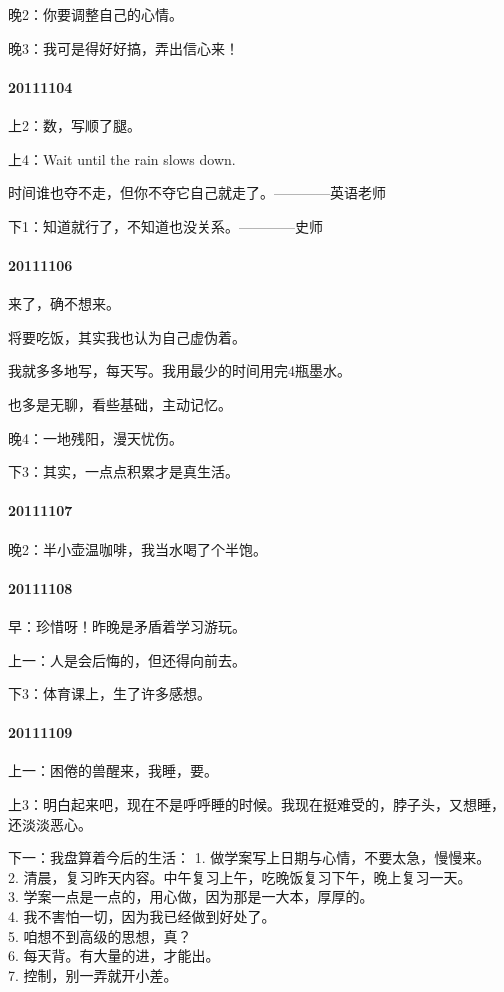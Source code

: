 \documentclass[UTF8]{book}
\begin{document}
晚2：你要调整自己的心情。

晚3：我可是得好好搞，弄出信心来！


\paragraph{20111104}
上2：数，写顺了腿。

上4：Wait until the rain slows down.

时间谁也夺不走，但你不夺它自己就走了。————英语老师

下1：知道就行了，不知道也没关系。————史师


\paragraph{20111106}
来了，确不想来。

将要吃饭，其实我也认为自己虚伪着。

我就多多地写，每天写。我用最少的时间用完4瓶墨水。

也多是无聊，看些基础，主动记忆。

晚4：一地残阳，漫天忧伤。

下3：其实，一点点积累才是真生活。


\paragraph{20111107}
晚2：半小壶温咖啡，我当水喝了个半饱。


\paragraph{20111108}
早：珍惜呀！昨晚是矛盾着学习游玩。

上一：人是会后悔的，但还得向前去。

下3：体育课上，生了许多感想。


\paragraph{20111109}
上一：困倦的兽醒来，我睡，要。

上3：明白起来吧，现在不是呼呼睡的时候。我现在挺难受的，脖子头，又想睡，还淡淡恶心。

下一：我盘算着今后的生活：
1. 做学案写上日期与心情，不要太急，慢慢来。\\
2. 清晨，复习昨天内容。中午复习上午，吃晚饭复习下午，晚上复习一天。\\
3. 学案一点是一点的，用心做，因为那是一大本，厚厚的。\\
4. 我不害怕一切，因为我已经做到好处了。\\
5. 咱想不到高级的思想，真？\\
6. 每天背。有大量的进，才能出。\\
7. 控制，别一弄就开小差。
\end{document}
